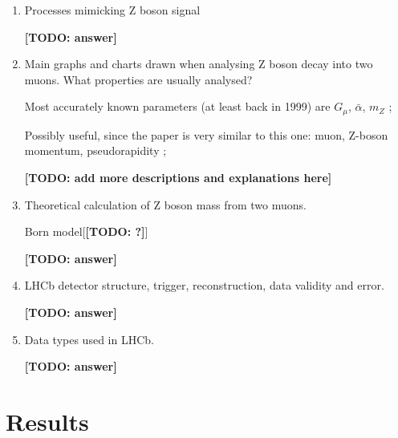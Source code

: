 \documentclass[11pt,a4paper,twoside]{article}
\begin{document}
\begin{enumerate}
        \item Processes mimicking Z boson signal

        \textbf{[TODO: answer]}

        
        \item Main graphs and charts drawn when analysing Z boson decay into two muons. What properties are usually analysed?


        Most accurately known parameters (at least back in 1999) are $G_{\mu}$, $\bar{\alpha}$, $m_Z$ \cite{novikov1999theory};


        Possibly useful, since the paper is very similar to this one: muon, Z-boson momentum, pseudorapidity \cite{khodaverdian2019accuracy};

        \textbf{[TODO: add more descriptions and explanations here]}


        \item Theoretical calculation of Z boson mass from two muons.

        Born model[\textbf{[TODO: ?]}]


        \textbf{[TODO: answer]}

        \item LHCb detector structure, trigger, reconstruction, data validity and error.

        \textbf{[TODO: answer]}

        \item Data types used in LHCb.

        \textbf{[TODO: answer]}
        
    \end{enumerate}


\section{Results}
    
\singlespacing
	
	


	
\end{document}
